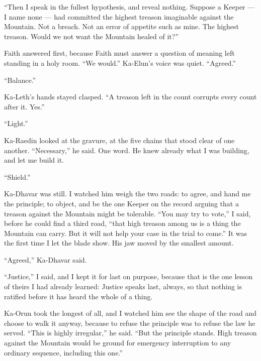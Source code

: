 ``Then I speak in the fullest hypothesis, and reveal nothing. Suppose a Keeper --- I name none --- had committed the highest treason imaginable against the Mountain. Not a breach. Not an error of appetite such as mine. The highest treason. Would we not want the Mountain healed of it?''\par
 
Faith answered first, because Faith must answer a question of meaning left standing in a holy room. ``We would.'' Ka-Elun's voice was quiet. ``Agreed.''\par

``Balance.''\par

Ka-Leth's hands stayed clasped. ``A treason left in the count corrupts every count after it. Yes.''\par

``Light.''\par

Ka-Raedin looked at the gravure, at the five chains that stood clear of one another. ``Necessary,'' he said. One word. He knew already what I was building, and let me build it.\par

``Shield.''\par

Ka-Dhavar was still. I watched him weigh the two roads: to agree, and hand me the principle; to object, and be the one Keeper on the record arguing that a treason against the Mountain might be tolerable. ``You may try to vote,'' I said, before he could find a third road, ``that high treason among us is a thing the Mountain can carry. But it will not help your case in the trial to come.'' It was the first time I let the blade show. His jaw moved by the smallest amount.\par

``Agreed,'' Ka-Dhavar said.\par

``Justice,'' I said, and I kept it for last on purpose, because that is the one lesson of theirs I had already learned: Justice speaks last, always, so that nothing is ratified before it has heard the whole of a thing.\par

Ka-Orun took the longest of all, and I watched him see the shape of the road and choose to walk it anyway, because to refuse the principle was to refuse the law he served. ``This is highly irregular,'' he said. ``But the principle stands. High treason against the Mountain would be ground for emergency interruption to any ordinary sequence, including this one.''\par
 
